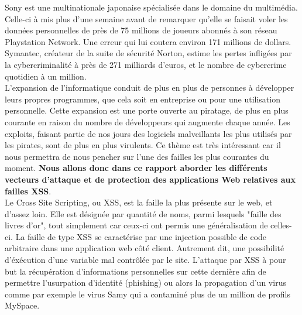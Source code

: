 \documentclass[a4paper,12pt]{report}
\begin{document}
Sony est une multinationale japonaise spécialisée dans le domaine du multimédia. Celle-ci à mis plus d'une semaine avant de remarquer qu'elle se faisait voler les données personnelles de près de 75 millions de joueurs abonnés à son réseau Playstation Network. Une erreur qui lui coutera environ 171 millions de dollars. Symantec, créateur de la suite de sécurité Norton, estime les pertes infligées par la cybercriminalité à près de 271 milliards d'euros, et le nombre de cybercrime quotidien à un million.\\

L’expansion de l’informatique conduit de plus en plus de personnes à développer leurs propres programmes, que cela soit en entreprise ou pour une utilisation personnelle. Cette expansion est une porte ouverte au piratage, de plus en plus courante en raison du nombre de développeurs qui augmente chaque année. Les exploits, faisant partie de nos jours des logiciels malveillants les plus utilisés par les pirates, sont de plus en plus virulents.
Ce thème est très intéressant car il nous permettra de nous pencher sur l'une des failles les plus courantes du moment. \textbf{Nous allons donc dans ce rapport aborder les différents vecteurs d'attaque et de protection des applications Web relatives aux failles XSS}.\\

Le Cross Site Scripting, ou XSS, est la faille la plus présente sur le web, et d'assez loin. Elle est désignée par quantité de noms, parmi lesquels "faille des livres d'or", tout simplement car ceux-ci ont permis une généralisation de celles-ci. La faille de type XSS se caractérise par une injection possible de code arbitraire dans une application web côté client. Autrement dit, une possibilité d'éxécution d'une variable mal contrôlée par le site. L'attaque par XSS à pour but la récupération d'informations personnelles sur cette dernière afin de permettre l'usurpation d'identité (phishing) ou alors la propagation d'un virus comme par exemple le virus Samy qui a contaminé plus de un million de profils MySpace. \\
\end{document}
